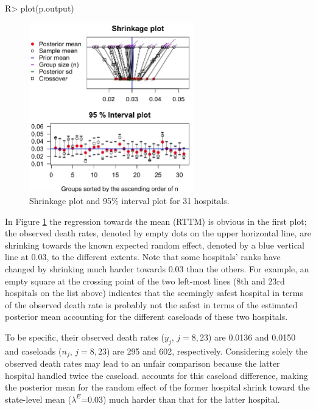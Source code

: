 \documentclass[article]{jss}
\begin{document}
\begin{CodeChunk}
\begin{CodeInput}
R> plot(p.output)
\end{CodeInput}
\end{CodeChunk}
\begin{figure}[h]
\begin{center}
\includegraphics[width = 2.8in]{hospital1.png}
\caption{Shrinkage plot and 95\% interval plot for 31 hospitals.}
\label{fig:hospshr}
\end{center}
\end{figure}

In Figure \ref{fig:hospshr} the regression towards the mean (RTTM) is obvious in the first plot; the observed death rates, denoted by empty dots on the upper horizontal line, are shrinking towards the known expected random effect, denoted by a blue vertical line at 0.03, to the different extents. Note that some hospitals' ranks have changed by shrinking much harder towards 0.03 than the others. For example, an empty square at the crossing point of the two left-most lines (8th and 23rd hospitals on the list above) indicates that  the seemingly safest hospital in terms of the observed death rate is probably not the safest in terms of the estimated posterior mean accounting for the different caseloads of these two hospitals. 

To be specific, their observed death rates ($y_{j}$, $j=8, 23$) are 0.0136 and 0.0150 and caseloads ($n_{j}$, $j=8, 23$) are 295 and 602, respectively. Considering solely the observed death rates may lead to an unfair comparison because the latter hospital handled twice the caseload.  accounts for this caseload difference, making the posterior mean for the random effect of the former hospital shrink toward the state-level mean ($\lambda^E$=0.03) much harder than that for the latter hospital.
\end{document}
